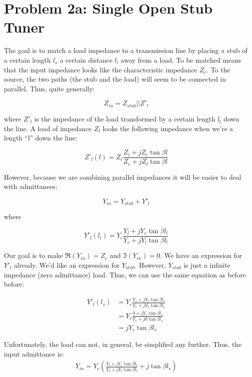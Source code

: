 \section*{Problem 2a: Single Open Stub Tuner}

The goal is to match a load impedance to a transmission line by placing a stub
of a certain length $l_s$ a certain distance $l_l$ away from a load. To be
matched means that the input impedance looks like the characteristic impedance
$Z_c$. To the source, the two paths (the stub and the load) will seem to be
connected in parallel. Thus, quite generally:

\[ 
        Z_{in} = Z_{stub} || Z'_l
\]

where $Z'_l$ is the impedance of the load transformed by a certain length
$l_{l}$ down the line. A load of impedance $Z_l$ looks the following
impedance when we're a length ``l'' down the line:

\[ 
        Z'_l(l) = Z_c \frac{Z_l + j Z_c \tan \beta l}{Z_c + j Z_l \tan \beta l} 
\]

However, because we are combining parallel impedances it will be easier to deal
with admittances:

\[ 
        Y_{in} = Y_{stub} + Y'_l 
\]

where

\[ 
        Y'_l(l_l) = Y_c \frac{Y_l + j Y_c\tan\beta l_l}{Y_c + j Y_l \tan \beta
        l_l}
\]

Our goal is to make $\Re \left( Y_{in} \right) = Z_c$ and $ \Im \left( Y_{in}
\right) = 0$. We have an expression for $Y'_l$ already. We'd like an expression
for $Y_{stub}$. However, $Y_{stub}$ is just a infinite impedance (zero
admittance) load. Thus, we can use the same equation as before before:

\begin{align*}
    Y'_l(l_s) &= Y_c \frac{Y_s + j Y_c\tan\beta l_s}{Y_c + j Y_s \tan \beta
       l_s}  \\
       &= Y_c \frac{0 + jY_c\tan\beta l_s}{Y_c + j0\tan\beta l_s} \\
       &= j Y_c \tan \beta l_s
\end{align*}

Unfortunately, the load can not, in general, be simplified any further. Thus,
the input admittance is:
\begin{align*}
    Y_{in} = Y_c \left( \frac{Y_l + j Y_c\tan\beta l_l}{Y_c + j Y_l \tan \beta
    l_l} + j \tan \beta l_s \right)
\end{align*}

